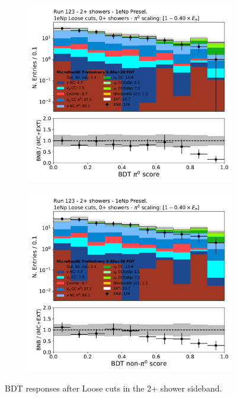 \begin{figure}[H]
    \begin{center}
    \begin{subfigure}{0.45\textwidth}
    \includegraphics[width=1.00\textwidth]{Sidebands/Figures/1eNp/TwoShower/TwoPShr_NP_NPLAllShr_pi0e040/pi0_score_log.pdf}
    \end{subfigure}
    \begin{subfigure}{0.45\textwidth}
    \includegraphics[width=1.00\textwidth]{Sidebands/Figures/1eNp/TwoShower/TwoPShr_NP_NPLAllShr_pi0e040/nonpi0_score_log.pdf}
    \end{subfigure}
    \caption{\label{fig:sb:1eNp:twopshr:loose:bdt} BDT responses after \npsel Loose cuts in the 2+ shower sideband.}
    \end{center}
\end{figure}

